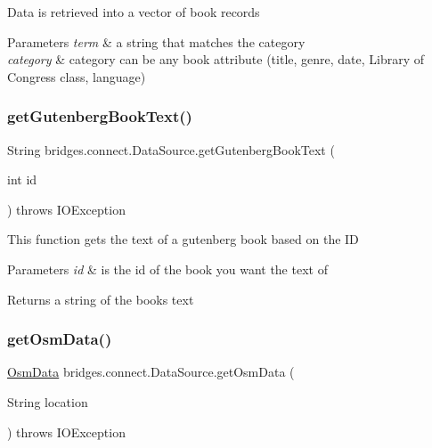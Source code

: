 Data is retrieved into a vector of book records


\begin{DoxyParams}{Parameters}
{\em term} & a string that matches the category \\
\hline
{\em category} & category can be any book attribute (title, genre, date, Library of Congress class, language) \\
\hline
\end{DoxyParams}
\mbox{\label{classbridges_1_1connect_1_1_data_source_ae6a17bd40228b89350fa186a2caad292}} 
\subsubsection{\texorpdfstring{get\+Gutenberg\+Book\+Text()}{getGutenbergBookText()}}
{\footnotesize\ttfamily String bridges.\+connect.\+Data\+Source.\+get\+Gutenberg\+Book\+Text (\begin{DoxyParamCaption}\item[{int}]{id }\end{DoxyParamCaption}) throws I\+O\+Exception}

This function gets the text of a gutenberg book based on the ID


\begin{DoxyParams}{Parameters}
{\em id} & is the id of the book you want the text of\\
\hline
\end{DoxyParams}
\begin{DoxyReturn}{Returns}
a string of the book\textquotesingle{}s text 
\end{DoxyReturn}
\mbox{\label{classbridges_1_1connect_1_1_data_source_a592a35a9f3285fd1d6e76932bd982eeb}} 
\subsubsection{\texorpdfstring{get\+Osm\+Data()}{getOsmData()}\hspace{0.1cm}{\footnotesize\ttfamily [1/4]}}
{\footnotesize\ttfamily \hyperlink{classbridges_1_1data__src__dependent_1_1_osm_data}{Osm\+Data} bridges.\+connect.\+Data\+Source.\+get\+Osm\+Data (\begin{DoxyParamCaption}\item[{String}]{location }\end{DoxyParamCaption}) throws I\+O\+Exception}

